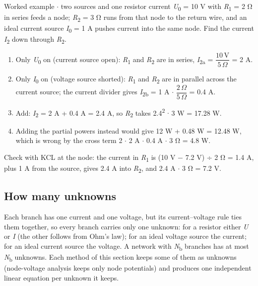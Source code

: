 \documentclass[11pt]{article}
\begin{document}
\begin{keepsection}
\begin{keepsection}
\begin{workedbox}{Worked example \ensuremath{\cdot} two sources and one resistor current}
\textit{U}\textsubscript{0} = 10 V with \textit{R}\textsubscript{1} = 2 Ω in series feeds a node; \textit{R}\textsubscript{2} = 3 Ω runs from that node to the return wire, and an ideal current source \textit{I}\textsubscript{0} = 1 A pushes current into the same node. Find the current \textit{I}\textsubscript{2} down through \textit{R}\textsubscript{2}.

\begin{enumerate}
\item Only \textit{U}\textsubscript{0} on (current source open): \textit{R}\textsubscript{1} and \textit{R}\textsubscript{2} are in series, \textit{I}\textsubscript{2a} = {\small\ensuremath{\dfrac{10\, \mathrm{V}}{5\, Ω}}} = 2 A.
\item Only \textit{I}\textsubscript{0} on (voltage source shorted): \textit{R}\textsubscript{1} and \textit{R}\textsubscript{2} are in parallel across the current source; the current divider gives \textit{I}\textsubscript{2b} = 1 A \ensuremath{\cdot} {\small\ensuremath{\dfrac{2\, Ω}{5\, Ω}}} = 0.4 A.
\item Add: \textit{I}\textsubscript{2} = 2 A + 0.4 A = 2.4 A, so \textit{R}\textsubscript{2} takes 2.4\textsuperscript{2} \ensuremath{\cdot} 3 W = 17.28 W.
\item Adding the partial powers instead would give 12 W + 0.48 W = 12.48 W, which is wrong by the cross term 2 \ensuremath{\cdot} 2 A \ensuremath{\cdot} 0.4 A \ensuremath{\cdot} 3 Ω = 4.8 W.
\end{enumerate}

Check with KCL at the node: the current in \textit{R}\textsubscript{1} is (10 V \ensuremath{-} 7.2 V) ÷ 2 Ω = 1.4 A, plus 1 A from the source, gives 2.4 A into \textit{R}\textsubscript{2}, and 2.4 A \ensuremath{\cdot} 3 Ω = 7.2 V.
\end{workedbox}
\end{keepsection}

\begin{keepsection}
\subsection{How many unknowns}

Each branch has one current and one voltage, but its current–voltage rule ties them together, so every branch carries only one unknown: for a resistor either \textit{U} or \textit{I} (the other follows from Ohm’s law); for an ideal voltage source the current; for an ideal current source the voltage. A network with \textit{N}\textsubscript{b} branches has at most \textit{N}\textsubscript{b} unknowns. Each method of this section keeps some of them as unknowns (node-voltage analysis keeps only node potentials) and produces one independent linear equation per unknown it keeps.
\end{keepsection}


\end{keepsection}
\end{document}

